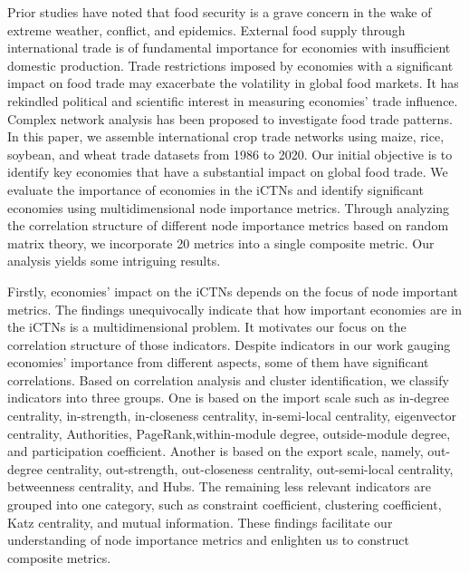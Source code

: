 \documentclass[preprint,3p,times,sort&compress]{elsarticle}
\begin{document}
Prior studies have noted that food security is a grave concern in the wake of extreme weather, conflict, and epidemics. External food supply through international trade is of fundamental importance for economies with insufficient domestic production. Trade restrictions imposed by economies with a significant impact on food trade may exacerbate the volatility in global food markets. It has rekindled political and scientific interest in measuring economies' trade influence. Complex network analysis has been proposed to investigate food trade patterns. In this paper, we assemble international crop trade networks using maize, rice, soybean, and wheat trade datasets from 1986 to 2020. Our initial objective is to identify key economies that have a substantial impact on global food trade. We evaluate the importance of economies in the iCTNs and identify significant economies using multidimensional node importance metrics. Through analyzing the correlation structure of different node importance metrics based on random matrix theory, we incorporate 20 metrics into a single composite metric. Our analysis yields some intriguing results.


Firstly, economies' impact on the iCTNs depends on the focus of node important metrics. The findings unequivocally indicate that how important economies are in the iCTNs is a multidimensional problem. It motivates our focus on the correlation structure of those indicators. Despite indicators in our work gauging economies' importance from different aspects, some of them have significant correlations. Based on correlation analysis and cluster identification, we classify indicators into three groups. One is based on the import scale such as in-degree centrality, in-strength, in-closeness centrality, in-semi-local centrality, eigenvector centrality, Authorities, PageRank,within-module degree, outside-module degree, and participation coefficient. Another is based on the export scale, namely, out-degree centrality, out-strength, out-closeness centrality, out-semi-local centrality, betweenness centrality, and Hubs. The remaining less relevant indicators are grouped into one category, such as constraint coefficient, clustering coefficient, Katz centrality, and mutual information. These findings facilitate our understanding of node importance metrics and 
enlighten us to construct composite metrics.
\end{document}

